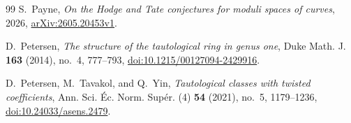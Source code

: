 \documentclass[12pt,reqno]{amsart}
\theoremstyle{definition}
\theoremstyle{remark}
\begin{document}
\begin{thebibliography}{99}
S.~Payne,
\emph{On the Hodge and Tate conjectures for moduli spaces of curves},
2026,
\href{https://arxiv.org/abs/2605.20453}{arXiv:2605.20453v1}.

D.~Petersen,
\emph{The structure of the tautological ring in genus one},
Duke Math. J. \textbf{163} (2014), no.~4, 777--793,
\href{https://doi.org/10.1215/00127094-2429916}
{doi:10.1215/00127094-2429916}.

D.~Petersen, M.~Tavakol, and Q.~Yin,
\emph{Tautological classes with twisted coefficients},
Ann. Sci. \'Ec. Norm. Sup\'er. (4) \textbf{54} (2021), no.~5, 1179--1236,
\href{https://doi.org/10.24033/asens.2479}{doi:10.24033/asens.2479}.

\end{thebibliography}
\end{document}
